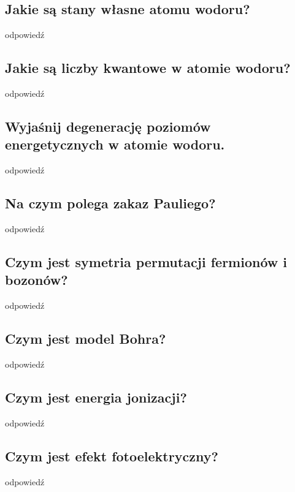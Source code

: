 \subsection{Jakie są stany własne atomu wodoru?}

odpowiedź

\subsection{Jakie są liczby kwantowe w atomie wodoru?}

odpowiedź

\subsection{Wyjaśnij degenerację poziomów energetycznych w atomie wodoru.}

odpowiedź

\subsection{Na czym polega zakaz Pauliego?}

odpowiedź

\subsection{Czym jest symetria permutacji fermionów i bozonów?}

odpowiedź

\subsection{Czym jest model Bohra?}

odpowiedź

\subsection{Czym jest energia jonizacji?}

odpowiedź

\subsection{Czym jest efekt fotoelektryczny?}

odpowiedź
